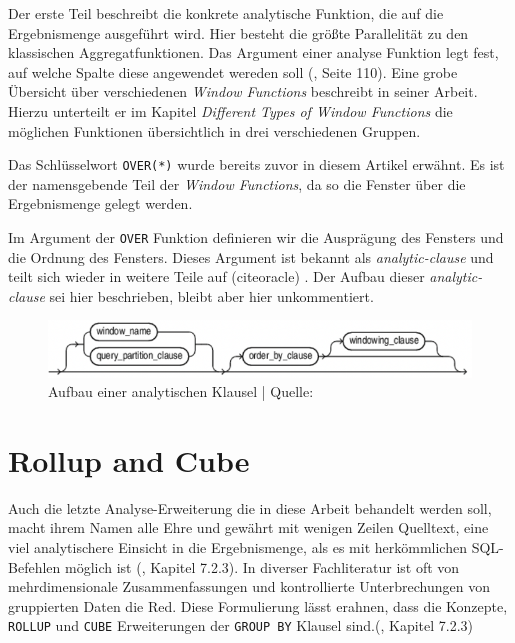Der erste Teil beschreibt die konkrete analytische Funktion, die auf die
Ergebnismenge ausgeführt wird. Hier besteht die größte Parallelität zu den klassischen
Aggregatfunktionen. Das Argument einer analyse Funktion legt fest, auf welche Spalte
diese angewendet wereden soll (\cite{schicker2017datenbanken}, Seite 110). Eine grobe
Übersicht über verschiedenen \textit{Window Functions} beschreibt
\cite{ibrahaim23} in seiner Arbeit. Hierzu unterteilt er im Kapitel \textit{Different
Types of Window Functions} die möglichen Funktionen übersichtlich in drei
verschiedenen Gruppen.

Das Schlüsselwort \texttt{OVER(*)} wurde bereits zuvor in diesem Artikel erwähnt.
Es ist der namensgebende Teil der \textit{Window Functions}, da so die Fenster
über die Ergebnismenge gelegt werden.

Im Argument der \texttt{OVER} Funktion definieren wir die Ausprägung des Fensters
und die Ordnung des Fensters. Dieses Argument ist bekannt als \textit{analytic-clause}
und teilt sich wieder in weitere Teile auf (cite{oracle}) . Der Aufbau dieser
\textit{analytic-clause} sei hier beschrieben, bleibt aber hier unkommentiert.

\begin{figure}[h]
	\centering
	\includegraphics[scale=0.5]{img/aufbauAnalyticClausel.jpg}
	\caption{ Aufbau einer analytischen Klausel | Quelle: \cite{oracle}}
\end{figure}


\section{Rollup and Cube}
Auch die letzte Analyse-Erweiterung die in diese Arbeit behandelt werden soll, macht
ihrem Namen alle Ehre und gewährt mit wenigen Zeilen Quelltext, eine viel
analytischere Einsicht in die Ergebnismenge, als es mit herkömmlichen SQL-Befehlen
möglich ist (\cite{melton2002advanced}, Kapitel 7.2.3). In diverser
Fachliteratur ist oft von mehrdimensionale Zusammenfassungen und kontrollierte
Unterbrechungen von gruppierten Daten die Red. Diese Formulierung lässt erahnen,
dass die Konzepte, \texttt{ROLLUP} und \texttt{CUBE} Erweiterungen der \texttt{GROUP
BY} Klausel sind.(\cite{melton2002advanced}, Kapitel 7.2.3)

